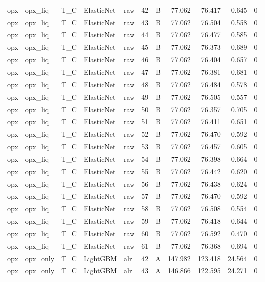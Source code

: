 \begin{longtable}{lllllrrrrrr}
opx & opx\_liq & T\_C & ElasticNet & raw & 42 & B & 77.062 & 76.417 & 0.645 & 0 \\
opx & opx\_liq & T\_C & ElasticNet & raw & 43 & B & 77.062 & 76.504 & 0.558 & 0 \\
opx & opx\_liq & T\_C & ElasticNet & raw & 44 & B & 77.062 & 76.477 & 0.585 & 0 \\
opx & opx\_liq & T\_C & ElasticNet & raw & 45 & B & 77.062 & 76.373 & 0.689 & 0 \\
opx & opx\_liq & T\_C & ElasticNet & raw & 46 & B & 77.062 & 76.404 & 0.657 & 0 \\
opx & opx\_liq & T\_C & ElasticNet & raw & 47 & B & 77.062 & 76.381 & 0.681 & 0 \\
opx & opx\_liq & T\_C & ElasticNet & raw & 48 & B & 77.062 & 76.484 & 0.578 & 0 \\
opx & opx\_liq & T\_C & ElasticNet & raw & 49 & B & 77.062 & 76.505 & 0.557 & 0 \\
opx & opx\_liq & T\_C & ElasticNet & raw & 50 & B & 77.062 & 76.357 & 0.705 & 0 \\
opx & opx\_liq & T\_C & ElasticNet & raw & 51 & B & 77.062 & 76.411 & 0.651 & 0 \\
opx & opx\_liq & T\_C & ElasticNet & raw & 52 & B & 77.062 & 76.470 & 0.592 & 0 \\
opx & opx\_liq & T\_C & ElasticNet & raw & 53 & B & 77.062 & 76.457 & 0.605 & 0 \\
opx & opx\_liq & T\_C & ElasticNet & raw & 54 & B & 77.062 & 76.398 & 0.664 & 0 \\
opx & opx\_liq & T\_C & ElasticNet & raw & 55 & B & 77.062 & 76.442 & 0.620 & 0 \\
opx & opx\_liq & T\_C & ElasticNet & raw & 56 & B & 77.062 & 76.438 & 0.624 & 0 \\
opx & opx\_liq & T\_C & ElasticNet & raw & 57 & B & 77.062 & 76.470 & 0.592 & 0 \\
opx & opx\_liq & T\_C & ElasticNet & raw & 58 & B & 77.062 & 76.508 & 0.554 & 0 \\
opx & opx\_liq & T\_C & ElasticNet & raw & 59 & B & 77.062 & 76.418 & 0.644 & 0 \\
opx & opx\_liq & T\_C & ElasticNet & raw & 60 & B & 77.062 & 76.592 & 0.470 & 0 \\
opx & opx\_liq & T\_C & ElasticNet & raw & 61 & B & 77.062 & 76.368 & 0.694 & 0 \\
opx & opx\_only & T\_C & LightGBM & alr & 42 & A & 147.982 & 123.418 & 24.564 & 0 \\
opx & opx\_only & T\_C & LightGBM & alr & 43 & A & 146.866 & 122.595 & 24.271 & 0 \\

\end{longtable}
